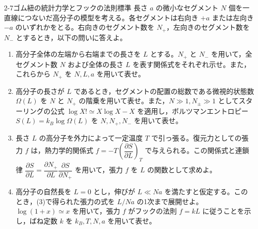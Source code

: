 
\begin{mondai}{2-7}{ゴム紐の統計力学とフックの法則}{標準}
長さ $a$ の微小なセグメント $N$ 個を一直線につないだ高分子の模型を考える。各セグメントは右向き $+a$ または左向き $-a$ のいずれかをとる。右向きのセグメント数を $N_+$，左向きのセグメント数を $N_-$ とするとき，以下の問いに答えよ。

\begin{enumerate}
  \item 高分子全体の左端から右端までの長さを $L$ とする。$N_+$ と $N_-$ を用いて，全セグメント数 $N$ および全体の長さ $L$ を表す関係式をそれぞれ示せ。また，これらから $N_+$ を $N, L, a$ を用いて表せ。

  \item 高分子の長さが $L$ であるとき，セグメントの配置の総数である微視的状態数 $\Omega(L)$ を $N$ と $N_+$ の階乗を用いて表せ。また，$N \gg 1, N_\pm \gg 1$ としてスターリングの公式 $\log X! \simeq X \log X - X$ を適用し，ボルツマンエントロピー $S(L) = k_B \log \Omega(L)$ を $N, N_+, N_-$ を用いて表せ。

  \item 長さ $L$ の高分子を外力によって一定温度 $T$ で引っ張る。復元力としての張力 $f$ は，熱力学的関係式 $f = -T \left( \dfrac{\partial S}{\partial L} \right)_T$ で与えられる。この関係式と連鎖律 $\dfrac{\partial S}{\partial L} = \dfrac{\partial N_+}{\partial L} \dfrac{\partial S}{\partial N_+}$ を用いて，張力 $f$ を $L$ の関数として求めよ。

  \item 高分子の自然長を $L=0$ とし，伸びが $L \ll Na$ を満たすと仮定する。このとき，(3)で得られた張力の式を $L/Na$ の1次まで展開せよ。$\log(1+x) \simeq x$ を用いて，張力 $f$ がフックの法則 $f = k L$ に従うことを示し，ばね定数 $k$ を $k_B, T, N, a$ を用いて表せ。
\end{enumerate}
\end{mondai}

